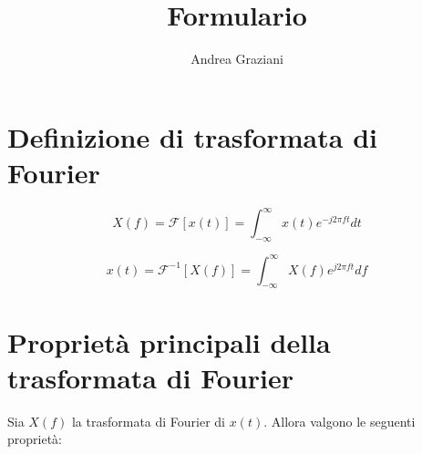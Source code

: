 \documentclass[10pt,a4paper]{article}
\author{Andrea Graziani}
\title{Formulario}
\begin{document}
\section{Definizione di trasformata di Fourier}

\begin{equation}
X(f) = \mathcal{F} \left[ x(t) \right] = \int^{\infty}_{-\infty} x(t)e^{-j2\pi ft} dt
\end{equation}

\begin{equation}
x(t) = \mathcal{F}^{-1} \left[ X(f) \right] = \int^{\infty}_{-\infty} X(f)e^{j2\pi ft} df
\end{equation}

\section{Proprietà principali della trasformata di Fourier}

Sia $X(f)$ la trasformata di Fourier di $x(t)$. Allora valgono le seguenti proprietà:
\end{document}
